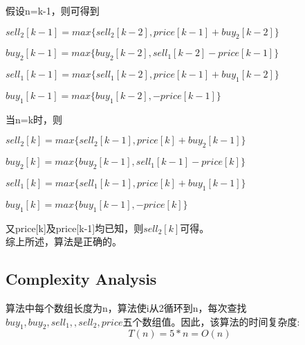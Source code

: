 \documentclass{article}
\begin{document}
\begin{CJK*}{UTF8}{gbsn}
假设n=k-1，则可得到

\begin{center} 
$sell_2[k-1]=max\{sell_2[k-2], price[k-1]+buy_2[k-2]\}$

$buy_2[k-1]=max\{buy_2[k-2], sell_1[k-2]-price[k-1]\}$

$sell_1[k-1]=max\{sell_1[k-2], price[k-1]+buy_1[k-2]\}$

$buy_1[k-1]=max\{buy_1[k-2], -price[k-1]\}$
\end{center} 

当n=k时，则

\begin{center} 
$sell_2[k]=max\{sell_2[k-1], price[k]+buy_2[k-1]\}$

$buy_2[k]=max\{buy_2[k-1], sell_1[k-1]-price[k]\}$

$sell_1[k]=max\{sell_1[k-1], price[k]+buy_1[k-1]\}$

$buy_1[k]=max\{buy_1[k-1], -price[k]\}$
\end{center} 

又price[k]及price[k-1]均已知，则$sell_2[k]$可得。
\\

综上所述，算法是正确的。

\subsection{Complexity Analysis}
算法中每个数组长度为n，算法使i从2循环到n，每次查找$buy_1,buy_2,sell_1,,sell_2,price$五个数组值。因此，该算法的时间复杂度:
\begin{equation}
T(n) = 5*n = O(n)
\end{equation}


\end{CJK*}
\end{document}
